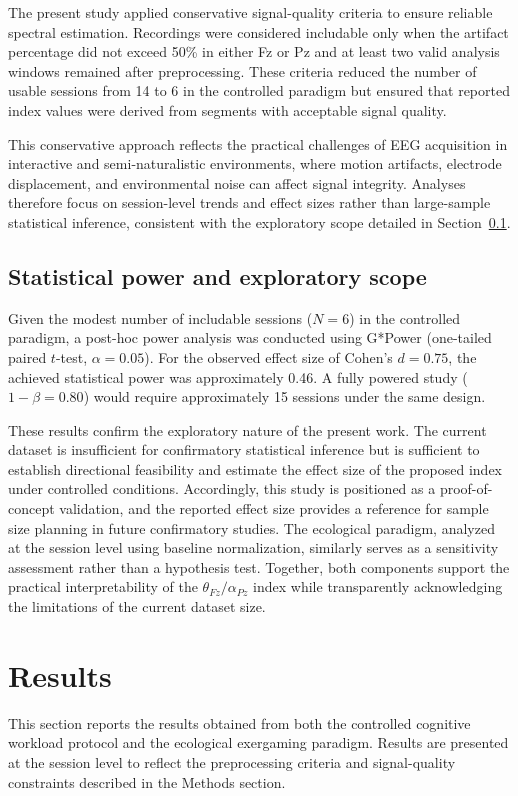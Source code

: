 \documentclass[10pt]{iopart}
\begin{document}
The present study applied conservative signal-quality criteria
to ensure reliable spectral estimation. Recordings were considered
includable only when the artifact percentage did not exceed 50\%
in either Fz or Pz and at least two valid analysis windows
remained after preprocessing. These criteria reduced the number
of usable sessions from 14 to 6 in the controlled paradigm but
ensured that reported index values were derived from segments
with acceptable signal quality.

This conservative approach reflects the practical challenges of
EEG acquisition in interactive and semi-naturalistic environments,
where motion artifacts, electrode displacement, and environmental
noise can affect signal integrity. Analyses therefore focus on
session-level trends and effect sizes rather than large-sample
statistical inference, consistent with the exploratory scope
detailed in Section~\ref{sec:power}.

\subsection{Statistical power and exploratory scope}
\label{sec:power}

Given the modest number of includable sessions ($N = 6$) in the
controlled paradigm, a post-hoc power analysis was conducted using
G*Power (one-tailed paired $t$-test, $\alpha = 0.05$). For the
observed effect size of Cohen's $d = 0.75$, the achieved statistical
power was approximately 0.46. A fully powered study ($1-\beta = 0.80$)
would require approximately 15 sessions under the same design.

These results confirm the exploratory nature of the present work.
The current dataset is insufficient for confirmatory statistical
inference but is sufficient to establish directional feasibility
and estimate the effect size of the proposed index under controlled
conditions. Accordingly, this study is positioned as a
proof-of-concept validation, and the reported effect size provides
a reference for sample size planning in future confirmatory studies.
The ecological paradigm, analyzed at the session level using
baseline normalization, similarly serves as a sensitivity assessment
rather than a hypothesis test. Together, both components support
the practical interpretability of the $\theta_{Fz}/\alpha_{Pz}$
index while transparently acknowledging the limitations of the
current dataset size.
\section{Results}
This section reports the results obtained from both the controlled cognitive workload protocol and the ecological exergaming paradigm. Results are presented at the session level to reflect the preprocessing criteria and signal-quality constraints described in the Methods section.
\end{document}

